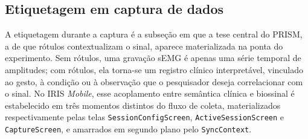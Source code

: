 \subsection{Etiquetagem em captura de dados}\label{subsec:IRISMobileRotulos}

A etiquetagem durante a captura é a subseção em que a tese central do PRISM, a de que rótulos contextualizam o sinal, aparece materializada na ponta do experimento. Sem rótulos, uma gravação sEMG é apenas uma série temporal de amplitudes; com rótulos, ela torna-se um registro clínico interpretável, vinculado ao gesto, à condição ou à observação que o pesquisador deseja correlacionar com o sinal. No IRIS \textit{Mobile}, esse acoplamento entre semântica clínica e biossinal é estabelecido em três momentos distintos do fluxo de coleta, materializados respectivamente pelas telas \texttt{SessionConfigScreen}, \texttt{ActiveSessionScreen} e \texttt{CaptureScreen}, e amarrados em segundo plano pelo \texttt{SyncContext}.

